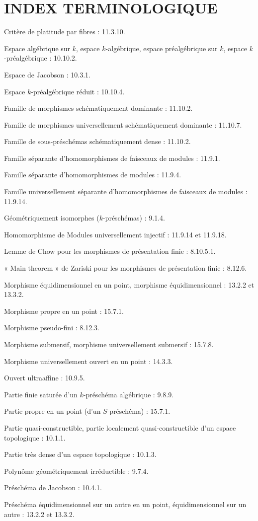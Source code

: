 {}
\section*{INDEX TERMINOLOGIQUE}

\begingroup
\footnotesize
\setlength{\parindent}{0pt}
\setlength{\parskip}{1.1pt}
\newcommand{\EGAIVthreeTerm}[2]{#1 : #2.\par}

\EGAIVthreeTerm{Critère de platitude par fibres}{11.3.10}
\EGAIVthreeTerm{Espace algébrique sur $k$, espace $k$-algébrique, espace
préalgébrique sur $k$, espace $k$-préalgébrique}{10.10.2}
\EGAIVthreeTerm{Espace de Jacobson}{10.3.1}
\EGAIVthreeTerm{Espace $k$-préalgébrique réduit}{10.10.4}
\EGAIVthreeTerm{Famille de morphismes schématiquement dominante}{11.10.2}
\EGAIVthreeTerm{Famille de morphismes universellement schématiquement dominante}{11.10.7}
\EGAIVthreeTerm{Famille de sous-préschémas schématiquement dense}{11.10.2}
\EGAIVthreeTerm{Famille séparante d'homomorphismes de faisceaux de modules}{11.9.1}
\EGAIVthreeTerm{Famille séparante d'homomorphismes de modules}{11.9.4}
\EGAIVthreeTerm{Famille universellement séparante d'homomorphismes de faisceaux de modules}{11.9.14}
\EGAIVthreeTerm{Géométriquement isomorphes ($k$-préschémas)}{9.1.4}
\EGAIVthreeTerm{Homomorphisme de Modules universellement injectif}{11.9.14 et 11.9.18}
\EGAIVthreeTerm{Lemme de Chow pour les morphismes de présentation finie}{8.10.5.1}
\EGAIVthreeTerm{« Main theorem » de Zariski pour les morphismes de présentation finie}{8.12.6}
\EGAIVthreeTerm{Morphisme équidimensionnel en un point, morphisme équidimensionnel}{13.2.2 et 13.3.2}
\EGAIVthreeTerm{Morphisme propre en un point}{15.7.1}
\EGAIVthreeTerm{Morphisme pseudo-fini}{8.12.3}
\EGAIVthreeTerm{Morphisme submersif, morphisme universellement submersif}{15.7.8}
\EGAIVthreeTerm{Morphisme universellement ouvert en un point}{14.3.3}
\EGAIVthreeTerm{Ouvert ultraaffine}{10.9.5}
\EGAIVthreeTerm{Partie finie saturée d'un $k$-préschéma algébrique}{9.8.9}
\EGAIVthreeTerm{Partie propre en un point (d'un $S$-préschéma)}{15.7.1}
\EGAIVthreeTerm{Partie quasi-constructible, partie localement quasi-constructible d'un espace topologique}{10.1.1}
\EGAIVthreeTerm{Partie très dense d'un espace topologique}{10.1.3}
\EGAIVthreeTerm{Polynôme géométriquement irréductible}{9.7.4}
\EGAIVthreeTerm{Préschéma de Jacobson}{10.4.1}
\EGAIVthreeTerm{Préschéma équidimensionnel sur un autre en un point, équidimensionnel sur un autre}{13.2.2 et 13.3.2}
